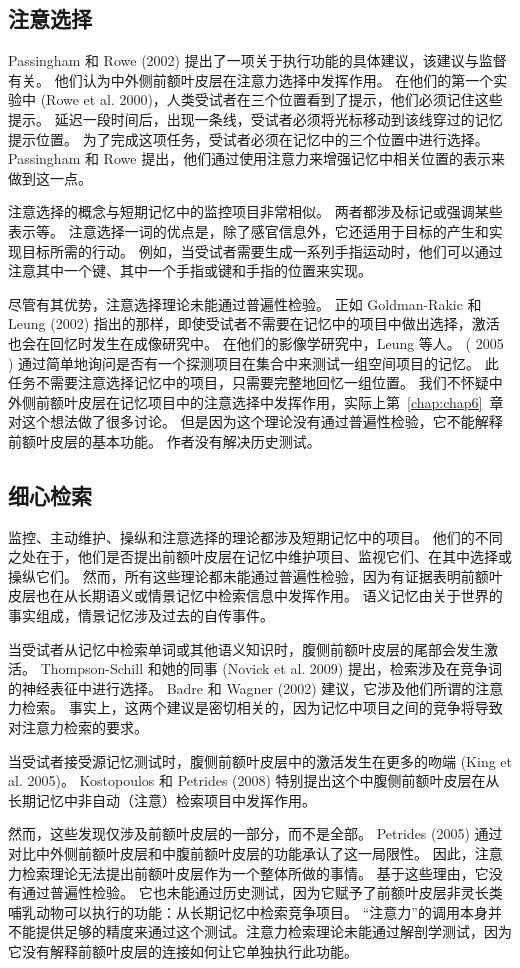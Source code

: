\subsection{注意选择}
Passingham 和 Rowe (2002) 提出了一项关于执行功能的具体建议，该建议与监督有关。 他们认为中外侧前额叶皮层在注意力选择中发挥作用。 在他们的第一个实验中 (Rowe et al. 2000)，人类受试者在三个位置看到了提示，他们必须记住这些提示。 延迟一段时间后，出现一条线，受试者必须将光标移动到该线穿过的记忆提示位置。 为了完成这项任务，受试者必须在记忆中的三个位置中进行选择。 Passingham 和 Rowe 提出，他们通过使用注意力来增强记忆中相关位置的表示来做到这一点。
\par 
注意选择的概念与短期记忆中的监控项目非常相似。 两者都涉及标记或强调某些表示等。 注意选择一词的优点是，除了感官信息外，它还适用于目标的产生和实现目标所需的行动。 例如，当受试者需要生成一系列手指运动时，他们可以通过注意其中一个键、其中一个手指或键和手指的位置来实现。
\par 
尽管有其优势，注意选择理论未能通过普遍性检验。 正如 Goldman-Rakic 和 Leung (2002) 指出的那样，即使受试者不需要在记忆中的项目中做出选择，激活也会在回忆时发生在成像研究中。 在他们的影像学研究中，Leung 等人。 ( 2005 ) 通过简单地询问是否有一个探测项目在集合中来测试一组空间项目的记忆。 此任务不需要注意选择记忆中的项目，只需要完整地回忆一组位置。 我们不怀疑中外侧前额叶皮层在记忆项目中的注意选择中发挥作用，实际上第~\ref{chap:chap6}~章对这个想法做了很多讨论。 但是因为这个理论没有通过普遍性检验，它不能解释前额叶皮层的基本功能。 作者没有解决历史测试。
\subsection{细心检索}
监控、主动维护、操纵和注意选择的理论都涉及短期记忆中的项目。 他们的不同之处在于，他们是否提出前额叶皮层在记忆中维护项目、监视它们、在其中选择或操纵它们。 然而，所有这些理论都未能通过普遍性检验，因为有证据表明前额叶皮层也在从长期语义或情景记忆中检索信息中发挥作用。 语义记忆由关于世界的事实组成，情景记忆涉及过去的自传事件。
\par 
当受试者从记忆中检索单词或其他语义知识时，腹侧前额叶皮层的尾部会发生激活。 Thompson-Schill 和她的同事 (Novick et al. 2009) 提出，检索涉及在竞争词的神经表征中进行选择。 Badre 和 Wagner (2002) 建议，它涉及他们所谓的注意力检索。 事实上，这两个建议是密切相关的，因为记忆中项目之间的竞争将导致对注意力检索的要求。
\par 
当受试者接受源记忆测试时，腹侧前额叶皮层中的激活发生在更多的吻端 (King et al. 2005)。 Kostopoulos 和 Petrides (2008) 特别提出这个中腹侧前额叶皮层在从长期记忆中非自动（注意）检索项目中发挥作用。
\par 
然而，这些发现仅涉及前额叶皮层的一部分，而不是全部。 Petrides (2005) 通过对比中外侧前额叶皮层和中腹前额叶皮层的功能承认了这一局限性。 因此，注意力检索理论无法提出前额叶皮层作为一个整体所做的事情。 基于这些理由，它没有通过普遍性检验。 它也未能通过历史测试，因为它赋予了前额叶皮层非灵长类哺乳动物可以执行的功能：从长期记忆中检索竞争项目。 “注意力”的调用本身并不能提供足够的精度来通过这个测试。注意力检索理论未能通过解剖学测试，因为它没有解释前额叶皮层的连接如何让它单独执行此功能。
